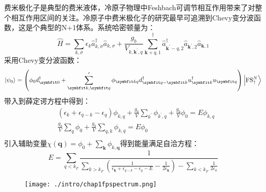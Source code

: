 费米极化子是典型的费米液体，冷原子物理中Feshbach可调节相互作用带来了对整个相互作用区间的关注。冷原子中费米极化子的研究最早可追溯到Chevy变分波函数\cite{chevy2006}，这是个典型的N+1体系。系统哈密顿量为：
\begin{equation}
\hat{H}=\sum_{k, \sigma} \epsilon_{k} \hat{a}_{k, \sigma}^{\dagger} \hat{a}_{k, \sigma}+\frac{g_{b}}{V_{k, \boldsymbol{k}^{\prime}, q}} \sum_{\boldsymbol{k}+q, 1}^{\dagger} \hat{a}_{\boldsymbol{k}^{\prime}-q, 2}^{\dagger} \hat{a}_{\boldsymbol{k}^{\prime}, 2} \hat{a}_{\boldsymbol{k}, 1}
\end{equation}
采用Chevy变分波函数：
\begin{equation}
\left|\psi_{0}\right\rangle=\left(\phi_{0} d_{\Vector{0}}^{\dagger}+\sum_{\Vector{k}, \Vector{q}}^{\prime} \phi_{\Vector{k q}} d_{\Vector{q}-\Vector{k}}^{\dagger} u_{\Vector{k}}^{\dagger} u_{\Vector{q}}\right)\left|\mathrm{FS}_{\uparrow}^{N}\right\rangle
\end{equation}
带入到薛定谔方程中得到：
\begin{equation}
\begin{split}
&\left(\epsilon_{k}+\epsilon_{q-k}-\epsilon_{q}\right) \phi_{k, q}+\frac{g_{b}}{V} \sum_{k^{\prime}} \phi_{k^{\prime}, q}+\frac{g_{b}}{V} \phi_{0}=E \phi_{k, q}\\
&\frac{g_{b}}{V} \sum_{q} \phi_{0}+\frac{g_{b}}{V} \sum_{q, k} \phi_{k, q}=E \phi_{0}\\
\end{split}
\end{equation}
引入辅助变量$\chi(\boldsymbol{q})=\phi_{0}+\sum_{\boldsymbol{k}} \phi_{k, \boldsymbol{q}}$得到能量满足自洽方程：
\begin{equation}
E=\sum_{q<k_{F}} \frac{1}{\sum_{k>k_{F}}\left(\frac{1}{\epsilon_{\boldsymbol{k}}+\epsilon_{q-k}-\epsilon_{q}-E}-\frac{1}{2 \epsilon_{\boldsymbol{k}}}\right)-\sum_{k<k_{F}} \frac{1}{2 \epsilon_{k}}} \label{consistentEQ}
\end{equation}
\begin{figure}[!htbp]
    \centering
    \texttt{[image: ./intro/chap1fpspectrum.png]}
    \label{fpchevyE}
\end{figure}
